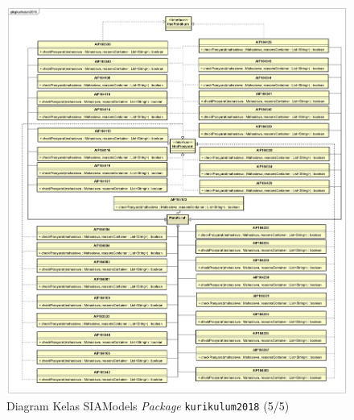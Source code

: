 \begin{figure}[H]
\centering
\includegraphics[scale=0.2]{Gambar/class-diagram-siamodels-mk-kurikulum-2018-5}
\caption{Diagram Kelas SIAModels \textit{Package} \texttt{kurikulum2018} (5/5)}
\label{fig:siamodels_class_2018_kurikulum_5}
\end{figure}

